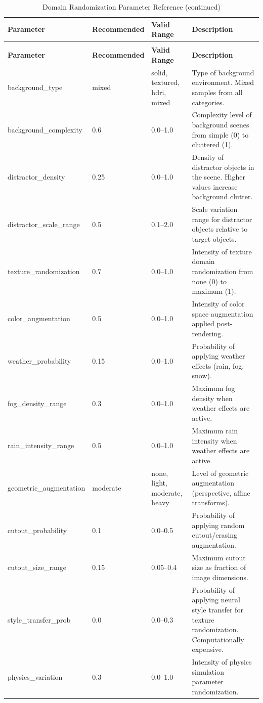 \begin{longtable}{p{3.5cm}p{2cm}p{2.5cm}p{5.5cm}}
\caption{Domain Randomization Parameter Reference} \label{tab:domain_rand} \\
\toprule
\textbf{Parameter} & \textbf{Recommended} & \textbf{Valid Range} & \textbf{Description} \\
\midrule
\endfirsthead
\caption[]{Domain Randomization Parameter Reference (continued)} \\
\toprule
\textbf{Parameter} & \textbf{Recommended} & \textbf{Valid Range} & \textbf{Description} \\
\midrule
\endhead
\bottomrule
\endfoot
\bottomrule
\endlastfoot
background\_type & mixed & solid, textured, hdri, mixed & Type of background environment. Mixed samples from all categories. \\
\addlinespace
background\_complexity & 0.6 & 0.0--1.0 & Complexity level of background scenes from simple (0) to cluttered (1). \\
\addlinespace
distractor\_density & 0.25 & 0.0--1.0 & Density of distractor objects in the scene. Higher values increase background clutter. \\
\addlinespace
distractor\_scale\_range & 0.5 & 0.1--2.0 & Scale variation range for distractor objects relative to target objects. \\
\addlinespace
texture\_randomization & 0.7 & 0.0--1.0 & Intensity of texture domain randomization from none (0) to maximum (1). \\
\addlinespace
color\_augmentation & 0.5 & 0.0--1.0 & Intensity of color space augmentation applied post-rendering. \\
\addlinespace
weather\_probability & 0.15 & 0.0--1.0 & Probability of applying weather effects (rain, fog, snow). \\
\addlinespace
fog\_density\_range & 0.3 & 0.0--1.0 & Maximum fog density when weather effects are active. \\
\addlinespace
rain\_intensity\_range & 0.5 & 0.0--1.0 & Maximum rain intensity when weather effects are active. \\
\addlinespace
geometric\_augmentation & moderate & none, light, moderate, heavy & Level of geometric augmentation (perspective, affine transforms). \\
\addlinespace
cutout\_probability & 0.1 & 0.0--0.5 & Probability of applying random cutout/erasing augmentation. \\
\addlinespace
cutout\_size\_range & 0.15 & 0.05--0.4 & Maximum cutout size as fraction of image dimensions. \\
\addlinespace
style\_transfer\_prob & 0.0 & 0.0--0.3 & Probability of applying neural style transfer for texture randomization. Computationally expensive. \\
\addlinespace
physics\_variation & 0.3 & 0.0--1.0 & Intensity of physics simulation parameter randomization. \\
\end{longtable}

